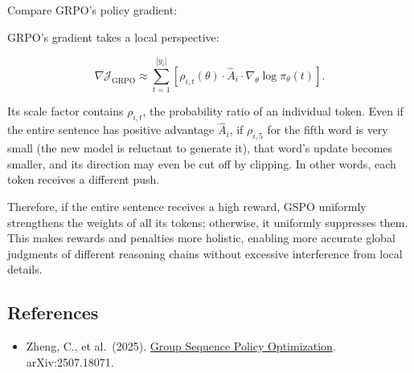 Compare GRPO's policy gradient:

GRPO's gradient takes a local perspective:

\[
\nabla \mathcal{J}_{\mathrm{GRPO}}
\approx
\sum_{t=1}^{|y_i|}
\left[
\rho_{i,t}(\theta)
\cdot
\hat{A}_i
\cdot
\nabla_\theta \log \pi_\theta(t)
\right].
\]

Its scale factor contains \(\rho_{i,t}\), the probability ratio of an individual token. Even if the entire sentence has positive advantage \(\hat{A}_i\), if \(\rho_{i,5}\) for the fifth word is very small (the new model is reluctant to generate it), that word's update becomes smaller, and its direction may even be cut off by clipping. In other words, each token receives a different push.

Therefore, if the entire sentence receives a high reward, GSPO uniformly strengthens the weights of all its tokens; otherwise, it uniformly suppresses them. This makes rewards and penalties more holistic, enabling more accurate global judgments of different reasoning chains without excessive interference from local details.

\FloatBarrier
{}
\hypertarget{references-111}{%
\subsection{References}\label{references-111}}

\vspace{0.25em}
\begin{itemize}
\tightlist
\item
  Zheng, C., et al.~(2025). \href{https://arxiv.org/abs/2507.18071}{Group Sequence Policy Optimization}. arXiv:2507.18071.
\end{itemize}

\clearpage
